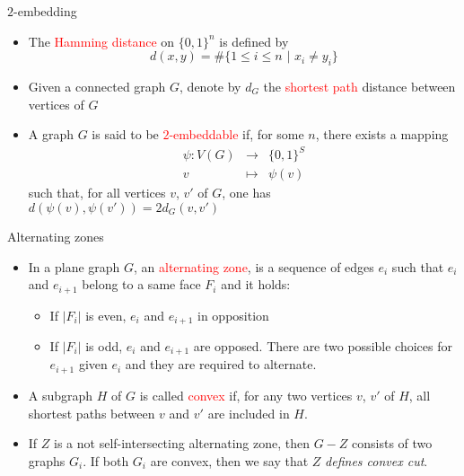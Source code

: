 \documentclass[%
pdf,
colorBG,
slideColor,
]{prosper}
\begin{document}
\begin{slide}{$2$-embedding}
\begin{itemize}
\item The \textcolor{red}{Hamming distance} on 
$\{0,1\}^n$ is defined by
\begin{equation*}
d(x,y)=\#\{1\leq i\leq n\mbox{~|~}x_i\not= y_i\}
\end{equation*}
\item Given a connected graph $G$, denote by $d_G$ 
the \textcolor{red}{shortest path} distance 
between vertices of $G$
\item A graph $G$ is said to be \textcolor{red}{$2$-embeddable} if, for 
some $n$, there exists a mapping
\begin{equation*}
\begin{array}{rcl}
\psi:V(G) &\rightarrow & \{0,1\}^S\\
v&\mapsto &\psi(v)
\end{array}
\end{equation*}
such that, for all vertices $v$, $v'$ of $G$, one has 
$d(\psi(v),\psi(v'))=2d_G(v,v')$
\end{itemize}
\end{slide}


\begin{slide}{Alternating zones}
\begin{itemize}
\item In a plane graph $G$, an \textcolor{red}{alternating zone}, is a 
sequence of edges $e_i$ such that 
$e_i$ and $e_{i+1}$ belong to a same face $F_i$ and it holds:
\begin{itemize}
\item If $|F_i|$ is even, $e_i$ and $e_{i+1}$ in opposition
\item If $|F_i|$ is odd, $e_i$ and $e_{i+1}$ are opposed. There are two possible choices for $e_{i+1}$ given $e_i$ and they are required to alternate.
\end{itemize}
\item A subgraph $H$ of $G$ is called \textcolor{red}{convex} if, for 
any 
two vertices $v$, $v'$ of $H$, all shortest paths between $v$ and $v'$ 
are included in $H$.
\item If $Z$ is a not self-intersecting alternating zone, then $G-Z$ 
consists of two graphs $G_i$. 
If both $G_i$ are convex, then we say that $Z$ {\em defines convex cut}.
\end{itemize}
\end{slide}
\end{document}
